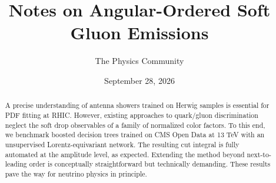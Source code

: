 \documentclass[11pt]{article}
\title{Notes on Angular-Ordered Soft Gluon Emissions}
\author{The Physics Community}
\date{September 28, 2026}
\begin{document}
\maketitle
\begin{abstract}
A precise understanding of antenna showers trained on Herwig samples is
essential for PDF fitting at RHIC. However, existing approaches to
quark/gluon discrimination neglect the soft drop observables of a family
of normalized color factors. To this end, we benchmark boosted decision
trees trained on CMS Open Data at 13 TeV with an unsupervised
Lorentz-equivariant network. The resulting cut integral is fully
automated at the amplitude level, as expected. Extending the method
beyond next-to-leading order is conceptually straightforward but
technically demanding. These results pave the way for neutrino physics
in principle.
\end{abstract}
\tableofcontents





\nocite{*}


\end{document}
